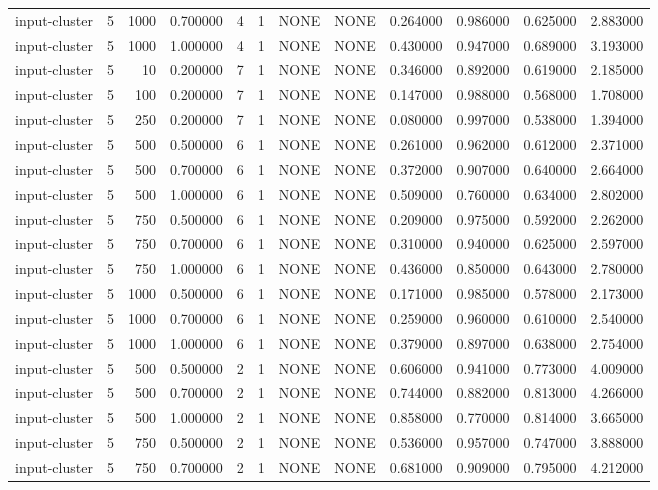 \begin{tabular}{lrrrllllrrrr}
input-cluster & 5 & 1000 & 0.700000 & 4 & 1 & NONE & NONE & 0.264000 & 0.986000 & 0.625000 & 2.883000 \\
input-cluster & 5 & 1000 & 1.000000 & 4 & 1 & NONE & NONE & 0.430000 & 0.947000 & 0.689000 & 3.193000 \\
input-cluster & 5 & 10 & 0.200000 & 7 & 1 & NONE & NONE & 0.346000 & 0.892000 & 0.619000 & 2.185000 \\
input-cluster & 5 & 100 & 0.200000 & 7 & 1 & NONE & NONE & 0.147000 & 0.988000 & 0.568000 & 1.708000 \\
input-cluster & 5 & 250 & 0.200000 & 7 & 1 & NONE & NONE & 0.080000 & 0.997000 & 0.538000 & 1.394000 \\
input-cluster & 5 & 500 & 0.500000 & 6 & 1 & NONE & NONE & 0.261000 & 0.962000 & 0.612000 & 2.371000 \\
input-cluster & 5 & 500 & 0.700000 & 6 & 1 & NONE & NONE & 0.372000 & 0.907000 & 0.640000 & 2.664000 \\
input-cluster & 5 & 500 & 1.000000 & 6 & 1 & NONE & NONE & 0.509000 & 0.760000 & 0.634000 & 2.802000 \\
input-cluster & 5 & 750 & 0.500000 & 6 & 1 & NONE & NONE & 0.209000 & 0.975000 & 0.592000 & 2.262000 \\
input-cluster & 5 & 750 & 0.700000 & 6 & 1 & NONE & NONE & 0.310000 & 0.940000 & 0.625000 & 2.597000 \\
input-cluster & 5 & 750 & 1.000000 & 6 & 1 & NONE & NONE & 0.436000 & 0.850000 & 0.643000 & 2.780000 \\
input-cluster & 5 & 1000 & 0.500000 & 6 & 1 & NONE & NONE & 0.171000 & 0.985000 & 0.578000 & 2.173000 \\
input-cluster & 5 & 1000 & 0.700000 & 6 & 1 & NONE & NONE & 0.259000 & 0.960000 & 0.610000 & 2.540000 \\
input-cluster & 5 & 1000 & 1.000000 & 6 & 1 & NONE & NONE & 0.379000 & 0.897000 & 0.638000 & 2.754000 \\
input-cluster & 5 & 500 & 0.500000 & 2 & 1 & NONE & NONE & 0.606000 & 0.941000 & 0.773000 & 4.009000 \\
input-cluster & 5 & 500 & 0.700000 & 2 & 1 & NONE & NONE & 0.744000 & 0.882000 & 0.813000 & 4.266000 \\
input-cluster & 5 & 500 & 1.000000 & 2 & 1 & NONE & NONE & 0.858000 & 0.770000 & 0.814000 & 3.665000 \\
input-cluster & 5 & 750 & 0.500000 & 2 & 1 & NONE & NONE & 0.536000 & 0.957000 & 0.747000 & 3.888000 \\
input-cluster & 5 & 750 & 0.700000 & 2 & 1 & NONE & NONE & 0.681000 & 0.909000 & 0.795000 & 4.212000 \\

\end{tabular}
